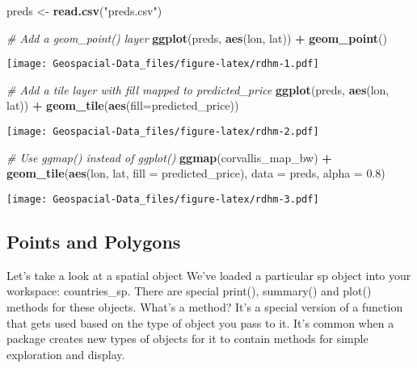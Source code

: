 \documentclass[]{article}
\newenvironment{Shaded}{\begin{snugshade}}{\end{snugshade}}
\newcommand{\CommentTok}[1]{\textcolor[rgb]{0.56,0.35,0.01}{\textit{#1}}}
\newcommand{\DataTypeTok}[1]{\textcolor[rgb]{0.13,0.29,0.53}{#1}}
\newcommand{\FloatTok}[1]{\textcolor[rgb]{0.00,0.00,0.81}{#1}}
\newcommand{\KeywordTok}[1]{\textcolor[rgb]{0.13,0.29,0.53}{\textbf{#1}}}
\newcommand{\NormalTok}[1]{#1}
\newcommand{\OperatorTok}[1]{\textcolor[rgb]{0.81,0.36,0.00}{\textbf{#1}}}
\newcommand{\StringTok}[1]{\textcolor[rgb]{0.31,0.60,0.02}{#1}}
\begin{document}
\begin{Shaded}
\begin{Highlighting}[]
\NormalTok{preds <-}\StringTok{ }\KeywordTok{read.csv}\NormalTok{(}\StringTok{"preds.csv"}\NormalTok{)}

\CommentTok{# Add a geom_point() layer}
\KeywordTok{ggplot}\NormalTok{(preds, }\KeywordTok{aes}\NormalTok{(lon, lat)) }\OperatorTok{+}\StringTok{ }\KeywordTok{geom_point}\NormalTok{()}
\end{Highlighting}
\end{Shaded}

\texttt{[image: Geospacial-Data\_files/figure-latex/rdhm-1.pdf]}

\begin{Shaded}
\begin{Highlighting}[]
\CommentTok{# Add a tile layer with fill mapped to predicted_price}
\KeywordTok{ggplot}\NormalTok{(preds, }\KeywordTok{aes}\NormalTok{(lon, lat)) }\OperatorTok{+}\StringTok{ }\KeywordTok{geom_tile}\NormalTok{(}\KeywordTok{aes}\NormalTok{(}\DataTypeTok{fill=}\NormalTok{predicted_price))}
\end{Highlighting}
\end{Shaded}

\texttt{[image: Geospacial-Data\_files/figure-latex/rdhm-2.pdf]}

\begin{Shaded}
\begin{Highlighting}[]
\CommentTok{# Use ggmap() instead of ggplot()}
\KeywordTok{ggmap}\NormalTok{(corvallis_map_bw) }\OperatorTok{+}
\StringTok{  }\KeywordTok{geom_tile}\NormalTok{(}\KeywordTok{aes}\NormalTok{(lon, lat, }\DataTypeTok{fill =}\NormalTok{ predicted_price), }
            \DataTypeTok{data =}\NormalTok{ preds, }\DataTypeTok{alpha =} \FloatTok{0.8}\NormalTok{)}
\end{Highlighting}
\end{Shaded}

\texttt{[image: Geospacial-Data\_files/figure-latex/rdhm-3.pdf]}

\hypertarget{points-and-polygons}{%
\subsection{Points and Polygons}\label{points-and-polygons}}

Let's take a look at a spatial object We've loaded a particular sp
object into your workspace: countries\_sp. There are special print(),
summary() and plot() methods for these objects. What's a method? It's a
special version of a function that gets used based on the type of object
you pass to it. It's common when a package creates new types of objects
for it to contain methods for simple exploration and display.
\end{document}
